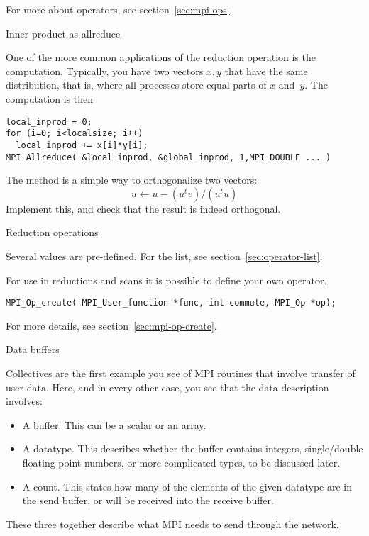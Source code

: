 For more about operators, see section~\ref{sec:mpi-ops}.

 {Inner product as allreduce}
\label{sec:dist-reduc}

One of the more common applications of the reduction operation
is the  computation. Typically, you have two vectors $x,y$
that have the same distribution, that is,
where all processes store equal parts of $x$ and~$y$.
The computation is then
\begin{lstlisting}
local_inprod = 0;
for (i=0; i<localsize; i++)
  local_inprod += x[i]*y[i];
MPI_Allreduce( &local_inprod, &global_inprod, 1,MPI_DOUBLE ... ) 
\end{lstlisting}

\begin{exercise}
  \label{ex:gramschmidt}
  The  method is a simple way to orthogonalize
  two vectors:
  \[ u \leftarrow u- (u^tv)/(u^tu) \]
  Implement this, and check that the result is indeed orthogonal.
\end{exercise}

 {Reduction operations}
\label{sec:mpi:op-reduct}

Several  values are pre-defined. For the list,
see section~\ref{sec:operator-list}.

For use in reductions and scans it is possible to define your own operator.

\begin{lstlisting}
MPI_Op_create( MPI_User_function *func, int commute, MPI_Op *op);
\end{lstlisting}

For more details, see section~\ref{sec:mpi-op-create}.

 {Data buffers}
\label{sec:mpi-buffers}

Collectives are the first example you see of MPI routines that
involve transfer of user data. Here, and in every other case,
you see that the data description involves:
\begin{itemize}
\item A buffer. This can be a scalar or an array.
\item A datatype. This describes whether the buffer contains integers,
  single/double floating point numbers, or more complicated types, to
  be discussed later.
\item A count. This states how many of the elements of the given
  datatype are in the send buffer, or will be received into the receive buffer.
\end{itemize}
These three together describe what MPI needs to send through the network.

